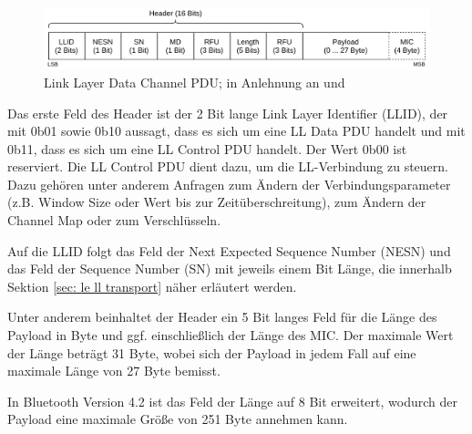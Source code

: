 \begin{figure}[H]
    \centering
    \includegraphics[width=1\textwidth]{graphics/link_layer_packetformat_pdu_data.pdf}
    \caption[Link Layer Data Channel PDU]{Link Layer Data Channel PDU; in Anlehnung an \cite{BtSpec_fig_2208a} und \cite{BtSpec_fig_2208b}}
    \label{fig: ll data channel pdu}
\end{figure}

Das erste Feld des Header ist der 2 Bit lange Link Layer Identifier (LLID), der mit 0b01 sowie 0b10 aussagt, dass es sich um eine LL Data PDU handelt und mit 0b11, dass es sich um eine LL Control PDU handelt. Der Wert 0b00 ist reserviert. Die LL Control PDU dient dazu, um die LL-Verbindung zu steuern. Dazu gehören unter anderem Anfragen zum Ändern der Verbindungsparameter (z.B. Window Size oder Wert bis zur Zeitüberschreitung), zum Ändern der Channel Map oder zum Verschlüsseln.

Auf die LLID folgt das Feld der Next Expected Sequence Number (NESN) und das Feld der Sequence Number (SN) mit jeweils einem Bit Länge, die innerhalb Sektion \ref{sec: le ll transport} näher erläutert werden.

Unter anderem beinhaltet der Header ein 5 Bit langes Feld für die Länge des Payload in Byte und ggf. einschließlich der Länge des MIC. Der maximale Wert der Länge beträgt 31 Byte, wobei sich der Payload in jedem Fall auf eine maximale Länge von 27 Byte bemisst. \cite{BtSpec4.0_2208-2209}

In Bluetooth Version 4.2 ist das Feld der Länge auf 8 Bit erweitert, wodurch der Payload eine maximale Größe von 251 Byte annehmen kann. \cite{BtSpec4.2_2589-2590}